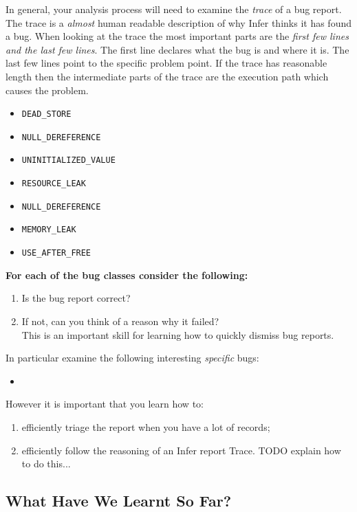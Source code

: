 In general, your analysis process will need to examine the \textit{trace} of a bug report.
The trace is a \textit{almost} human readable description of why Infer thinks it has found a bug.
When looking at the trace the most important parts are the \textit{first few lines and the last few lines}. The first line declares what the bug is and where it is. 
The last few lines point to the specific problem point. 
If the trace has reasonable length then the intermediate parts of the trace 
are the execution path which causes the problem. 


\begin{itemize}
	\itemsep0em
	\item \verb|DEAD_STORE|
	\item \verb|NULL_DEREFERENCE|
	\item \verb|UNINITIALIZED_VALUE|
	\item \verb|RESOURCE_LEAK|
	\item \verb|NULL_DEREFERENCE|
	\item \verb|MEMORY_LEAK|
	\item \verb|USE_AFTER_FREE|
\end{itemize}

\textbf{For each of the bug classes consider the following:}
\begin{enumerate}
	\item Is the bug report correct?
	\item If not, can you think of a reason why it failed? \\
	This is an important skill for learning how to quickly dismiss bug reports.
\end{enumerate}


In particular examine the following interesting \textit{specific} bugs:
\begin{itemize}
    \item {}
\end{itemize}


However it is important that you learn how to:
\begin{enumerate}
	\item efficiently triage the report when you have a lot of records;
	\item efficiently follow the reasoning of an Infer report Trace. TODO explain how to do this...
\end{enumerate}

\subsection{What Have We Learnt So Far?}

